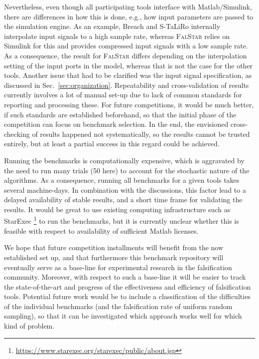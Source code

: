 \documentclass[a4paper]{easychair}
\newcommand{\STaLiRo}{S-TaLiRo\xspace}
\newcommand{\Breach}{Breach\xspace}
\newcommand{\FalStar}{\textsc{FalStar}\xspace}
\begin{document}
    Nevertheless, even though all participating tools interface with
    Matlab/Simulink, there are differences in how this is done, e.g.,
    how input parameters are passed to the simulation engine.  As an
    example, \Breach and \STaLiRo internally interpolate input signals
    to a high sample rate, whereas \FalStar relies on Simulink for
    this and provides compressed input signals with a low sample rate.
    As a consequence, the result for \FalStar differs depending on the
    interpolation setting of the input ports in the model, whereas
    that is not the case for the other tools.  Another issue that had
    to be clarified was the input signal specification, as discussed
    in Sec.~\ref{sec:organization}.  Repeatability and
    cross-validation of results currently involves a lot of manual
    set-up due to lack of common standards for reporting and
    processing these.  For future competitions, it would be much
    better, if such standards are established beforehand, so that the
    initial phase of the competition can focus on benchmark selection.
    In the end, the envisioned cross-checking of results happened not
    systematically, so the results cannot be trusted entirely, but at
    least a partial success in this regard could be achieved.

    Running the benchmarks is computationally expensive, which is
    aggravated by the need to run many trials (50 here) to account for
    the stochastic nature of the algorithms.  As a consequence,
    running all benchmarks for a given tools takes several machine-days.
    In combination with the discussions, this factor lead to a delayed
    availability of stable results, and a short time frame for
    validating the results.  It would be great to use existing
    computing infrastructure such as StarExec%
    \footnote{\url{https://www.starexec.org/starexec/public/about.jsp}}
    to run the benchmarks, but it is currently unclear whether this is
    feasible with respect to availability of sufficient Matlab
    licenses.

    We hope that future competition installments will benefit from the
    now established set up, and that furthermore this benchmark
    repository will eventually serve as a base-line for experimental
    research in the falsification community.  Moreover, with respect
    to such a base-line it will be easier to track the
    state-of-the-art and progress of the effectiveness and efficiency
    of falsification tools.  Potential future work would be to include
    a classification of the difficulties of the individual benchmarks
    (and the falsification rate of uniform random sampling), so that
    it can be investigated which approach works well for which kind of
    problem.
\end{document}
